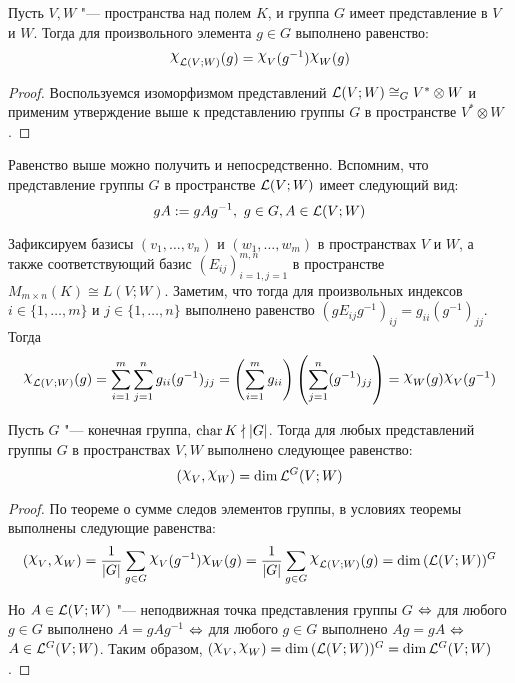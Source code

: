 \begin{corollary}
	Пусть $V, W$ "--- пространства над полем $K$, и группа $G$ имеет представление в $V$ и $W$. Тогда для произвольного элемента $g \in G$ выполнено равенство:
	\[\Chi_{\mc L(V ; W)}(g) = \Chi_V(g^{-1})\Chi_W(g)\]
\end{corollary}

\begin{proof}
	Воспользуемся изоморфизмом представлений $\mathcal L(V; W) \cong_G V^* \otimes W$ и применим утверждение выше к представлению группы $G$ в пространстве $V^* \otimes W$.
\end{proof}

\begin{note}
	Равенство выше можно получить и непосредственно. Вспомним, что представление группы $G$ в пространстве $\mathcal L(V; W)$ имеет следующий вид:
	\[gA := gAg^{-1},~g \in G, A \in \mathcal L(V; W)\]
	
	Зафиксируем базисы $(v_1, \dotsc, v_n)$ и $(w_1, \dotsc, w_m)$ в пространствах $V$ и $W$, а также соответствующий базис $(E_{ij})_{i = 1, j = 1}^{m, n}$ в пространстве $M_{m \times n}(K) \cong L(V; W)$. Заметим, что тогда для произвольных индексов $i \in \{1, \dotsc, m\}$ и $j \in \{1, \dotsc, n\}$ выполнено равенство $(gE_{ij}g^{-1})_{ij} = g_{ii}(g^{-1})_{jj}$. Тогда
	\[\Chi_{\mc L(V; W)}(g) = \sum_{i = 1}^{m}\sum_{j = 1}^{n}g_{ii}(g^{-1})_{jj} = \left(\sum_{i = 1}^{m}g_{ii}\right)\left(\sum_{j = 1}^{n}(g^{-1})_{jj}\right) = \Chi_W(g)\Chi_V(g^{-1})\]
\end{note}

\begin{theorem}
	Пусть $G$ "--- конечная группа, $\operatorname{char}{K} \nmid |G|$. Тогда для любых представлений группы $G$ в пространствах $V, W$ выполнено следующее равенство:
	\[(\Chi_{V}, \Chi_{W}) = \dim \mc L^G(V; W)\]
\end{theorem}

\begin{proof}
	По теореме о сумме следов элементов группы, в условиях теоремы выполнены следующие равенства:
	\[(\Chi_{V}, \Chi_{W}) = \frac1{|G|}\sum_{g \in G}\Chi_{V}(g^{-1})\Chi_{W}(g) = \frac1{|G|}\sum_{g \in G}\Chi_{\mc L(V; W)}(g) = \dim{(\mc L(V; W))^G}\]
	
	Но $A \in \mathcal L(V; W)$ "--- неподвижная точка представления группы $G$ $\Leftrightarrow$ для любого $g \in G$ выполнено $A = gAg^{-1}$ $\Leftrightarrow$ для любого $g \in G$ выполнено $Ag = gA$ $\Leftrightarrow$ $A \in \mathcal L^G(V; W)$. Таким образом, $(\Chi_{V}, \Chi_{W}) = \dim{(\mc L(V; W))^G} = \dim \mc L^G(V; W)$.
\end{proof}

